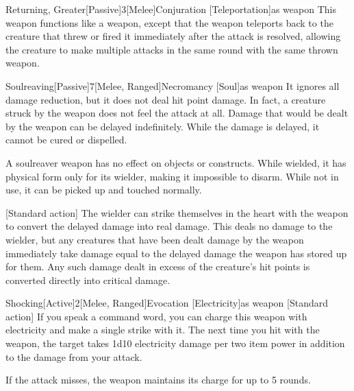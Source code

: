         \begin{magicitemdef}{Returning, Greater}[Passive]{3}[Melee]{Conjuration [Teleportation]}{as weapon}
             This weapon functions like a  weapon, except that the weapon teleports back to the creature that threw or fired it immediately after the attack is resolved, allowing the creature to make multiple attacks in the same round with the same thrown weapon.
        \end{magicitemdef}

        \begin{magicitemdef}{Soulreaving}[Passive]{7}[Melee, Ranged]{Necromancy [Soul]}{as weapon}
             It ignores all damage reduction, but it does not deal hit point damage.
            In fact, a creature struck by the weapon does not feel the attack at all.
            Damage that would be dealt by the weapon can be delayed indefinitely.
            While the damage is delayed, it cannot be cured or dispelled.

            A soulreaver weapon has no effect on objects or constructs.
            While wielded, it has physical form only for its wielder, making it impossible to disarm.
            While not in use, it can be picked up and touched normally.

            [Standard action] The wielder can strike themselves in the heart with the weapon to convert the delayed damage into real damage.
            This deals no damage to the wielder, but any creatures that have been dealt damage by the weapon immediately take damage equal to the delayed damage the weapon has stored up for them.
            Any such damage dealt in excess of the creature's hit points is converted directly into critical damage.
        \end{magicitemdef}

        \begin{magicitemdef}{Shocking}[Active]{2}[Melee, Ranged]{Evocation [Electricity]}{as weapon}
            [Standard action] If you speak a command word, you can charge this weapon with electricity and make a single strike with it.
            The next time you hit with the weapon, the target takes 1d10 electricity damage per two item power in addition to the damage from your attack.

            If the attack misses, the weapon maintains its charge for up to 5 rounds.
        \end{magicitemdef}

